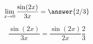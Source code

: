 \documentclass{ximera}
\author{Steven Gubkin}
\begin{document}
\begin{exercise}

\[\lim_{x \to 0} \frac{\sin(2x)}{3x} = \answer{2/3}\]

\begin{hint}
	\[\frac{\sin(2x)}{3x} = \frac{\sin(2x)}{2x} \frac{2}{3}\]
\end{hint}


\end{exercise}
\end{document}
